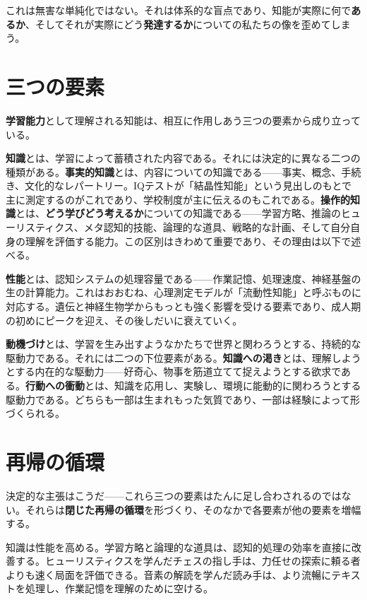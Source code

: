\documentclass[11pt, twoside, openright]{book}
\begin{document}
これは無害な単純化ではない。それは体系的な盲点であり、知能が実際に何で\textbf{あるか}、そしてそれが実際にどう\textbf{発達するか}についての私たちの像を歪めてしまう。

\section*{三つの要素}

\textbf{学習能力}として理解される知能は、相互に作用しあう三つの要素から成り立っている。

\textbf{知識}とは、学習によって蓄積された内容である。それには決定的に異なる二つの種類がある。\textbf{事実的知識}とは、内容についての知識である------事実、概念、手続き、文化的なレパートリー。IQテストが「結晶性知能」という見出しのもとで主に測定するのがこれであり、学校制度が主に伝えるのもこれである。\textbf{操作的知識}とは、\textbf{どう学びどう考えるか}についての知識である------学習方略、推論のヒューリスティクス、メタ認知的技能、論理的な道具、戦略的な計画、そして自分自身の理解を評価する能力。この区別はきわめて重要であり、その理由は以下で述べる。

\textbf{性能}とは、認知システムの処理容量である------作業記憶、処理速度、神経基盤の生の計算能力。これはおおむね、心理測定モデルが「流動性知能」と呼ぶものに対応する。遺伝と神経生物学からもっとも強く影響を受ける要素であり、成人期の初めにピークを迎え、その後しだいに衰えていく。

\textbf{動機づけ}とは、学習を生み出すようなかたちで世界と関わろうとする、持続的な駆動力である。それには二つの下位要素がある。\textbf{知識への渇き}とは、理解しようとする内在的な駆動力------好奇心、物事を筋道立てて捉えようとする欲求である。\textbf{行動への衝動}とは、知識を応用し、実験し、環境に能動的に関わろうとする駆動力である。どちらも一部は生まれもった気質であり、一部は経験によって形づくられる。

\section*{再帰の循環}

決定的な主張はこうだ------これら三つの要素はたんに足し合わされるのではない。それらは\textbf{閉じた再帰の循環}を形づくり、そのなかで各要素が他の要素を増幅する。

知識は性能を高める。学習方略と論理的な道具は、認知的処理の効率を直接に改善する。ヒューリスティクスを学んだチェスの指し手は、力任せの探索に頼る者よりも速く局面を評価できる。音素の解読を学んだ読み手は、より流暢にテキストを処理し、作業記憶を理解のために空ける。
\end{document}
